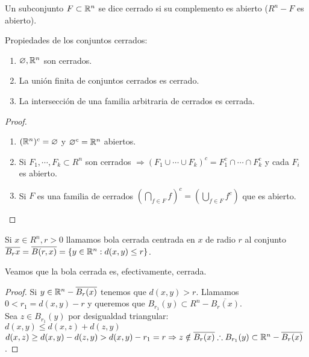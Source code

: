 \begin{definition}
  Un subconjunto $F \subset \mathbb{R}^n$ se dice cerrado si su complemento es abierto ($R^n - F$ es abierto).
\end{definition}


\begin{prop}
  Propiedades de los conjuntos cerrados:
  \begin{enumerate}
    \item $\varnothing, \mathbb{R}^n$ son cerrados.
    \item La unión finita de conjuntos cerrados es cerrado.
    \item La intersección de una familia arbitraria de cerrados es cerrada.
  \end{enumerate}
  \begin{proof}
    \begin{enumerate}
      \item $(\mathbb{R}^n)^c = \varnothing$ y $\varnothing^c = \mathbb{R}^n$ abiertos.
      \item Si $F_1, \cdots, F_k \subset R^n$ son cerrados $\Rightarrow (F_1 \cup \cdots \cup F_k)^c = F_1^c \cap \cdots \cap F_k^c$ y cada $F_i$ es abierto.
      \item Si $F$ es una familia de cerrados $(\bigcap_{f \in F} f)^c = (\bigcup_{f \in F} f^c)$ que es abierto.
    \end{enumerate}
  \end{proof}
\end{prop}

\begin{definition}
  Si $x \in R^n, r > 0$ llamamos bola cerrada centrada en $x$ de radio $r$ al conjunto $\overline{B_r{x}} = \overline{B(r, x)} = \{ y \in \mathbb{R}^n : d(x, y) \leq r \}$.
\end{definition}

\begin{prop}
  Veamos que la bola cerrada es, efectivamente, cerrada.
  \begin{proof}
    Si $y \in \mathbb{R}^n - \overline{B_r(x)}$ tenemos que $d(x, y) > r$. Llamamos $0 < r_1 = d(x, y) - r$ y queremos que $B_{r_1}(y) \subset R^n - \overline{B_r(x)}$. \\
    Sea $z \in B_{r_1}(y)$ por desigualdad triangular: \\
    $d(x, y) \leq d(x, z) + d(z, y)$ \\
    $d(x, z) \geq d(x, y) - d(z, y) > d(x, y) - r_1 = r \Rightarrow z \notin \overline{B_r(x)} \therefore B_{r_1}(y) \subset \mathbb{R}^n - \overline{B_r(x)}$.
  \end{proof}
\end{prop}

